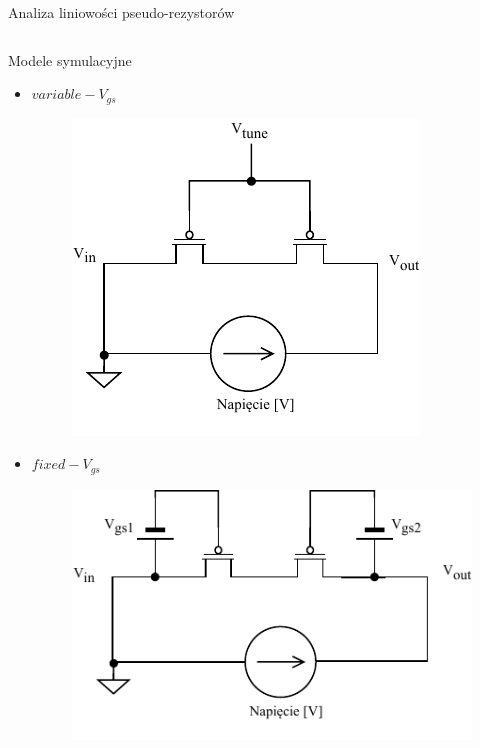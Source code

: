 \begin{frame}{Analiza liniowości pseudo-rezystorów}
    \vspace{-1em}



    \begin{columns}
        \begin{block}{Modele symulacyjne}
            \begin{itemize}
                \item $variable-V_{gs}$
                 \begin{figure}[H]
                    \centering
                    \includegraphics[scale = 0.5]{Figures/standardDC.pdf}
                \end{figure}
                \item $fixed-V_{gs}$
                \begin{figure}[H]
                    \centering
                    \includegraphics[scale = 0.5]{Figures/projectDC.pdf}
                \end{figure}
            \end{itemize}


\end{block}
\end{columns}
\end{frame}
